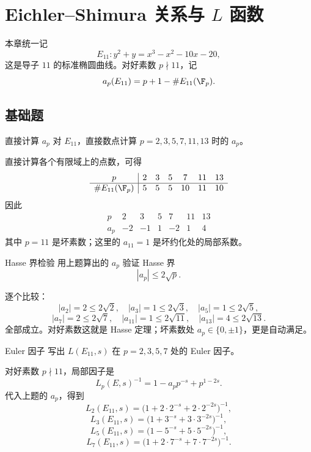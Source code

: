 \chapter{Eichler--Shimura 关系与 $L$ 函数}

本章统一记
\[
E_{11}: y^2+y=x^3-x^2-10x-20,
\]
这是导子 $11$ 的标准椭圆曲线。对好素数 $p\nmid 11$，记
\[
a_p(E_{11})=p+1-\#E_{11}(\F_p).
\]

\difficultykey

\section*{基础题}

\begin{problem}{直接计算 $a_p$ \easy}
对 $E_{11}$，直接数点计算 $p=2,3,5,7,11,13$ 时的 $a_p$。
\end{problem}
\begin{solution}
直接计算各个有限域上的点数，可得
\[
\begin{array}{c|cccccc}
p&2&3&5&7&11&13\\ \hline
\#E_{11}(\F_p)&5&5&5&10&11&10
\end{array}
\]
因此
\[
\begin{array}{c|cccccc}
p&2&3&5&7&11&13\\ \hline
a_p&-2&-1&1&-2&1&4
\end{array}
\]
其中 $p=11$ 是坏素数；这里的 $a_{11}=1$ 是坏约化处的局部系数。
\end{solution}

\begin{problem}{Hasse 界检验 \easy}
用上题算出的 $a_p$ 验证 Hasse 界
\[
|a_p|\le 2\sqrt p.
\]
\end{problem}
\begin{solution}
逐个比较：
\[
|a_2|=2\le 2\sqrt2,
\quad
|a_3|=1\le 2\sqrt3,
\quad
|a_5|=1\le 2\sqrt5,
\]
\[
|a_7|=2\le 2\sqrt7,
\quad
|a_{11}|=1\le 2\sqrt{11},
\quad
|a_{13}|=4\le 2\sqrt{13}.
\]
全部成立。对好素数这就是 Hasse 定理；坏素数处 $a_p\in\{0,\pm1\}$，更是自动满足。
\end{solution}

\begin{problem}{Euler 因子 \easy}
写出 $L(E_{11},s)$ 在 $p=2,3,5,7$ 处的 Euler 因子。
\end{problem}
\begin{solution}
对好素数 $p\nmid 11$，局部因子是
\[
L_p(E,s)^{-1}=1-a_pp^{-s}+p^{1-2s}.
\]
代入上题的 $a_p$，得到
\[
L_2(E_{11},s)=\bigl(1+2\cdot 2^{-s}+2\cdot 2^{-2s}\bigr)^{-1},
\]
\[
L_3(E_{11},s)=\bigl(1+3^{-s}+3\cdot 3^{-2s}\bigr)^{-1},
\]
\[
L_5(E_{11},s)=\bigl(1-5^{-s}+5\cdot 5^{-2s}\bigr)^{-1},
\]
\[
L_7(E_{11},s)=\bigl(1+2\cdot 7^{-s}+7\cdot 7^{-2s}\bigr)^{-1}.
\]
\end{solution}

